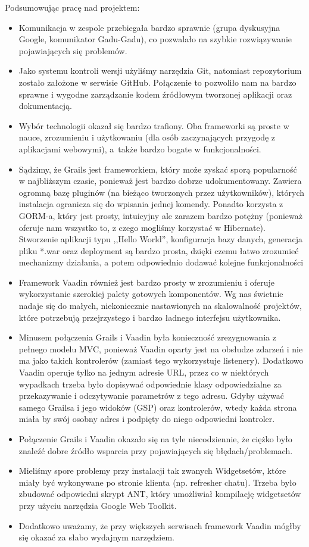\hspace{15pt}Podsumowując pracę nad projektem: 
\begin{itemize}
\item Komunikacja w zespole przebiegała bardzo sprawnie (grupa dyskusyjna Google, komunikator Gadu-Gadu), co pozwalało na szybkie rozwiązywanie pojawiających się problemów.
\item Jako systemu kontroli wersji użyliśmy narzędzia Git, natomiast repozytorium zostało założone w serwisie GitHub. Połączenie to pozwoliło nam na bardzo sprawne i wygodne zarządzanie kodem źródłowym tworzonej aplikacji oraz dokumentacją.
\item Wybór technologii okazał się bardzo trafiony. Oba frameworki są proste w nauce, zrozumieniu i użytkowaniu (dla osób zaczynających przygodę z aplikacjami webowymi), a~także bardzo bogate w funkcjonalności.
\item Sądzimy, że Grails jest frameworkiem, który może zyskać sporą popularność w najbliższym czasie, ponieważ jest bardzo dobrze udokumentowany. Zawiera ogromną bazę pluginów (na bieżąco tworzonych przez użytkowników), których instalacja ogranicza się do wpisania jednej komendy. Ponadto korzysta z GORM-a, który jest prosty, intuicyjny ale zarazem bardzo potężny (ponieważ oferuje nam wszystko to, z czego mogliśmy korzystać w Hibernate). Stworzenie aplikacji typu ,,Hello World'', konfiguracja bazy danych, generacja pliku *.war oraz deployment są bardzo prosta, dzięki czemu łatwo zrozumieć mechanizmy działania, a potem odpowiednio dodawać kolejne funkcjonalności
\item Framework Vaadin również jest bardzo prosty w zrozumieniu i oferuje wykorzystanie szerokiej palety gotowych komponentów. Wg nas świetnie nadaje się do małych, niekoniecznie nastawionych na skalowalność projektów, które potrzebują przejrzystego i bardzo ładnego interfejsu użytkownika.
\item Minusem połączenia Grails i Vaadin była konieczność zrezygnowania z pełnego modelu MVC, ponieważ Vaadin oparty jest na obsłudze zdarzeń i nie ma jako takich kontrolerów (zamiast tego wykorzystuje listenery). Dodatkowo Vaadin operuje tylko na jednym adresie URL, przez co w niektórych wypadkach trzeba było dopisywać odpowiednie klasy odpowiedzialne za przekazywanie i odczytywanie parametrów z tego adresu. Gdyby używać samego Grailsa i jego widoków (GSP) oraz kontrolerów, wtedy każda strona miała by swój osobny adres i podpięty do niego odpowiedni kontroler. 
\item Połączenie Grails i Vaadin okazało się na tyle niecodziennie, że ciężko było znaleźć dobre źródło wsparcia przy pojawiających się błędach/problemach.
\item Mieliśmy spore problemy przy instalacji tak zwanych Widgetsetów, które miały być wykonywane po stronie klienta (np. refresher chatu). Trzeba było zbudować odpowiedni skrypt ANT, który umożliwiał kompilację widgetsetów przy użyciu narzędzia Google Web Toolkit. 
\item Dodatkowo uważamy, że przy większych serwisach framework Vaadin mógłby się okazać za słabo wydajnym narzędziem.
\end{itemize}